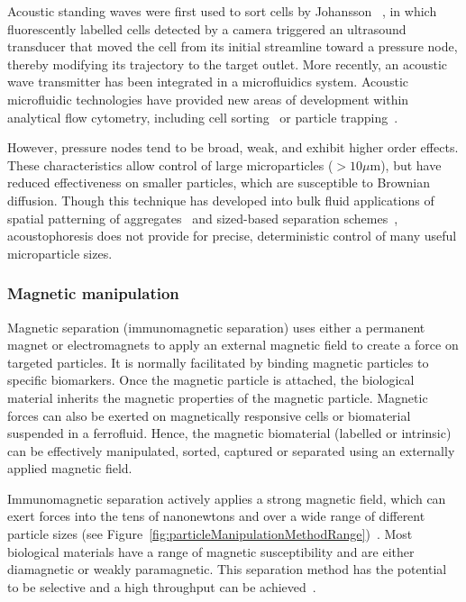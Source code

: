 Acoustic standing waves were first used to sort cells by Johansson \etal{}~\cite{Johansson2009}, in which fluorescently labelled cells detected by a camera triggered an ultrasound transducer that moved the cell from its initial streamline toward a pressure node, thereby modifying its trajectory to the target outlet. More recently, an acoustic wave transmitter has been integrated in a microfluidics system. Acoustic microfluidic technologies have provided new areas of development within analytical flow cytometry, including cell sorting~\cite{Piyasena2014,Ward2009} or particle trapping~\cite{Leibacher2015}.

However, pressure nodes tend to be broad, weak, and exhibit higher order effects. These characteristics allow control of large microparticles ($>10\mu$m), but have reduced effectiveness on smaller particles, which are susceptible to Brownian diffusion. Though this technique has developed into bulk fluid applications of spatial patterning of aggregates~\cite{Woodside1998} and sized-based separation schemes~\cite{Petersson2007}, acoustophoresis does not provide for precise, deterministic control of many useful microparticle sizes. 

\subsubsection{Magnetic manipulation}\label{subsubsec:magneticManipulation}
Magnetic separation (immunomagnetic separation) uses either a permanent magnet or electromagnets to apply an external magnetic field to create a force on targeted particles. It is normally facilitated by binding magnetic particles to specific biomarkers. Once the magnetic particle is attached, the biological material inherits the magnetic properties of the magnetic particle. Magnetic forces can also be exerted on magnetically responsive cells or biomaterial suspended in a ferrofluid. Hence, the magnetic biomaterial (labelled or intrinsic) can be effectively manipulated, sorted, captured or separated using an externally applied magnetic field. 

Immunomagnetic separation actively applies a strong magnetic field, which can exert forces into the tens of nanonewtons and over a wide range of different particle sizes (see Figure~\ref{fig:particleManipulationMethodRange})~\cite{Adair1991,Grahl1996}. Most biological materials have a range of magnetic susceptibility and are either diamagnetic or weakly paramagnetic. This separation method has the potential to be selective and a high throughput can be achieved~\cite{Sole2001,Yung2009,Hoshino2011,Earhart2014}.

